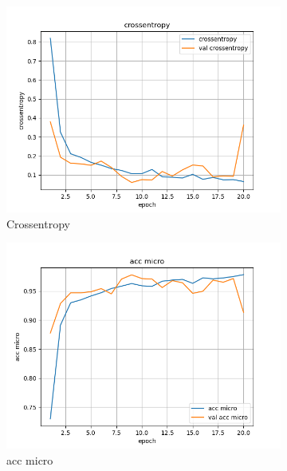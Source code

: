 \begin{figure}[ht]
    \centering
    \begin{subfigure}{0.32\textwidth}
        \centering
        \includegraphics[width=\linewidth]{../logs/resnet_allw_img256_2/crossentropy.png}
        \caption{Crossentropy}
    \end{subfigure}
    \begin{subfigure}{0.32\textwidth}
        \centering
        \includegraphics[width=\linewidth]{../logs/resnet_allw_img256_2/acc micro.png}
        \caption{acc micro}
    \end{subfigure}
    \begin{subfigure}{0.32\textwidth}
        \centering

\end{subfigure}
\end{figure}
